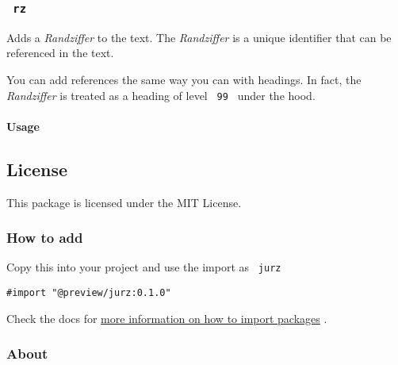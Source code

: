 \subsubsection{\texorpdfstring{\texttt{\ rz\ }}{ rz }}\label{rz}

Adds a \emph{Randziffer} to the text. The \emph{Randziffer} is a unique
identifier that can be referenced in the text.

You can add references the same way you can with headings. In fact, the
\emph{Randziffer} is treated as a heading of level \texttt{\ 99\ } under
the hood.

\paragraph{Usage}\label{usage-1}

\begin{Shaded}
\begin{Highlighting}[]

\end{Highlighting}
\end{Shaded}

\subsection{License}\label{license}

This package is licensed under the MIT License.

\subsubsection{How to add}\label{how-to-add}

Copy this into your project and use the import as \texttt{\ jurz\ }

\begin{verbatim}
#import "@preview/jurz:0.1.0"
\end{verbatim}



Check the docs for
\href{https://typst.app/docs/reference/scripting/\#packages}{more
information on how to import packages} .

\subsubsection{About}\label{about}

